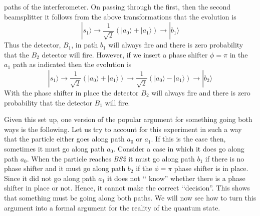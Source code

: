 \documentclass[12pt]{article}
\begin{document}
paths of the interferometer.  On passing through the first, then the second beamsplitter it follows from the above transformations that the evolution is \begin{equation} |s_1\rangle
\longrightarrow \frac{1}{\sqrt{2}} ( |a_0\rangle + |a_1\rangle ) \longrightarrow |b_1\rangle \end{equation} Thus the detector, $B_1$, in path $b_1$ will always fire and there is zero
probability that the $B_2$ detector will fire. However, if we insert a phase shifter $\phi=\pi$ in the $a_1$ path as indicated then the evolution is \begin{equation} |s_1\rangle
\longrightarrow \frac{1}{\sqrt{2}} ( |a_0\rangle + |a_1\rangle ) \longrightarrow \frac{1}{\sqrt{2}} ( |a_0\rangle - |a_1\rangle )\longrightarrow |b_2\rangle \end{equation} With the phase
shifter in place the detector $B_2$ will always fire and there is zero probability that the detector $B_1$ will fire.

Given this set up, one version of the popular argument for something going both ways is the following.  Let us try to account for this experiment in such a way that the particle either goes
along path $a_0$ or $a_1$.  If this is the case then, sometimes it must go along path $a_0$.  Consider a case in which it does go along path $a_0$.  When the particle reaches \emph{BS2} it
must go along path $b_1$ if there is no phase shifter and it must go along path $b_2$ if the $\phi=\pi$ phase shifter is in place. Since it did not go along path $a_1$ it does not \lq\lq
know'' whether there is a phase shifter in place or not.  Hence, it cannot make the correct \lq\lq decision''.  This shows that something must be going along both paths.  We will now see how
to turn this argument into a formal argument for the reality of the quantum state.
\end{document}
